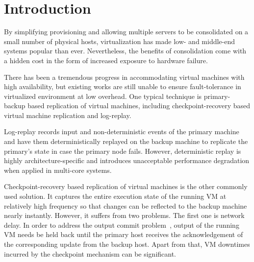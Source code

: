 \section{Introduction} \label{sec:intro}

By simplifying provisioning and allowing multiple servers to be consolidated on a small 
number of physical hosts, virtualization has made low- and middle-end systems popular 
than ever. Nevertheless, the benefits of consolidation come with a hidden cost in the 
form of increased exposure to hardware failure. 

There has been a tremendous progress in accommodating virtual machines with high availability, 
but existing works are still unable to ensure fault-tolerance in virtualized environment at 
low overhead. One typical technique is primary-backup based replication of virtual machines, 
including checkpoint-recovery based virtual machine replication and log-replay.



Log-replay records input and non-deterministic events of the primary machine and have them 
deterministically replayed on the backup machine to replicate the primary's state in case 
the primary node fails. However, deterministic replay is highly architecture-specific and 
introduces unacceptable performance degradation when applied in multi-core systems.

Checkpoint-recovery based replication of virtual machines is the other commonly used solution. 
It captures the entire execution state of the running VM at relatively high frequency so that 
changes can be reflected to the backup machine nearly instantly. However, it suffers from two 
problems. The first one is network delay. In order to address the output commit 
problem~\cite{strom1987volatile}, output of the running VM needs be held back until the primary 
host receives the acknowledgement of the corresponding update from the backup host. Apart from 
that, VM downtimes incurred by the checkpoint mechanism can be significant.


